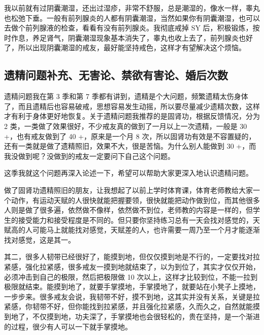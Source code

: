 \documentclass[fontset=founder]{ctexart}
\begin{document}
我以前就有过阴囊潮湿，还出过湿疹，非常不舒服，总是潮湿的，像水一样，睾丸也松弛下垂。一般有前列腺炎的人都有阴囊潮湿，当然如果你有阴囊潮湿，也可以去做个前列腺液的检查，看看有没有前列腺炎。我彻底戒掉 SY 后，积极锻炼，按时作息，养足肾气，阴囊潮湿现象基本消失了，睾丸也收上去了，前列腺炎也好了，所以出现阴囊潮湿的戒友，最好能坚持戒色，这样才有望解决这个烦恼。

\subsection{遗精问题补充、无害论、禁欲有害论、婚后次数}

遗精问题我在第 3 季和第 7 季都有讲到，遗精是个大问题，频繁遗精太伤身体了，而且遗精后也容易破戒，思想容易发生动摇，所以要尽量减少遗精次数，这样才有利于身体更好地恢复。关于遗精问题我推荐的是固肾功，根据反馈情况，分为 2 类，一类做了效果很好，不少戒友真的做到了一月以上一次遗精，一般是 30 +，也有戒友做到了 40 +，原来是一个月 8 次，所以固肾功有效是不容置疑的，还有一类就是做了遗精照旧，效果不大，很是苦恼。为什么别人能做到 30 +，而我没做到呢？没做到的戒友一定要问下自己这个问题。

这季我就这个问题再深入论述一下，希望可以帮助大家更深入地认识遗精问题。

做了固肾功遗精照旧的朋友，让我想起了以前上学时体育课，体育老师教给大家一个动作，有运动天赋的人很快就能把握要领，很快就能把动作做到位，而其他很多人则是做了很多遍，依然做不像样，依然做不到位，老师教的内容是一样的，但学生的接受能力和接受程度是不同的。但只要你坚持练习总有一天会找对感觉的，天赋高的人可能马上就能找对感觉，天赋差的人，也许需要一周乃至一个月才能逐渐找对感觉，这是其一。

其二，很多人韧带已经很好了，能摸到地，但仅仅摸到地是不行的，一定要找对拉紧感，强化拉紧感，很多戒友一摸到地就结束了，以为到位了，其实才仅仅开始，必须冲击到自己的极限，然后把极限做 10 次以上，这样才比较到位，不能一拉到极限就结束。能摸到地了，就要手掌摸地，手掌摸地了，就要站在小凳子上摸地，一步步来。很多戒友会说，我韧带不好，摸不到地，这其实并没有关系，关键是拉紧感，你韧带不好，但你能找到拉紧感，并且强化拉紧感，久而久之，自然就能摸到地了，不仅摸到地，功夫深了，手掌摸地也会很轻松的，贵在坚持，是一个渐进的过程，很少有人可以一下就手掌摸地。
\end{document}
